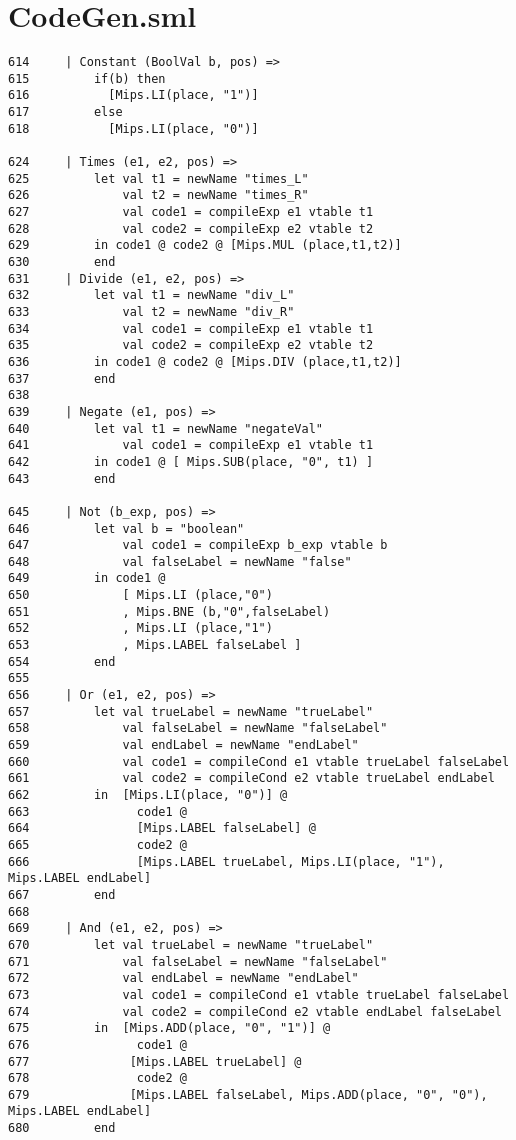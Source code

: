 \documentclass[paper=a4, fontsize=11pt]{scrartcl} %
\numberwithin{equation}{section} %
\numberwithin{figure}{section} %
\numberwithin{table}{section} %
\begin{document}
\chapter{CodeGen.sml}
\begin{lstlisting}
614	    | Constant (BoolVal b, pos) => 
615	        if(b) then 
616	          [Mips.LI(place, "1")] 
617	        else 
618	          [Mips.LI(place, "0")] 

624     | Times (e1, e2, pos) => 
625	        let val t1 = newName "times_L" 
626	            val t2 = newName "times_R" 
627	            val code1 = compileExp e1 vtable t1 
628	            val code2 = compileExp e2 vtable t2 
629	        in code1 @ code2 @ [Mips.MUL (place,t1,t2)] 
630	        end 
631	    | Divide (e1, e2, pos) => 
632	        let val t1 = newName "div_L" 
633	            val t2 = newName "div_R" 
634	            val code1 = compileExp e1 vtable t1 
635	            val code2 = compileExp e2 vtable t2 
636	        in code1 @ code2 @ [Mips.DIV (place,t1,t2)] 
637	        end 
638	 
639	    | Negate (e1, pos) => 
640	        let val t1 = newName "negateVal" 
641	            val code1 = compileExp e1 vtable t1 
642	        in code1 @ [ Mips.SUB(place, "0", t1) ] 
643	        end 

645	    | Not (b_exp, pos) => 
646	        let val b = "boolean" 
647	            val code1 = compileExp b_exp vtable b 
648	            val falseLabel = newName "false" 
649	        in code1 @ 
650	            [ Mips.LI (place,"0") 
651	            , Mips.BNE (b,"0",falseLabel) 
652	            , Mips.LI (place,"1") 
653	            , Mips.LABEL falseLabel ] 
654	        end 
655	     
656	    | Or (e1, e2, pos) => 
657	        let val trueLabel = newName "trueLabel" 
658	            val falseLabel = newName "falseLabel" 
659	            val endLabel = newName "endLabel" 
660	            val code1 = compileCond e1 vtable trueLabel falseLabel 
661	            val code2 = compileCond e2 vtable trueLabel endLabel 
662	        in  [Mips.LI(place, "0")] @  
663	              code1 @  
664	              [Mips.LABEL falseLabel] @  
665	              code2 @  
666	              [Mips.LABEL trueLabel, Mips.LI(place, "1"), Mips.LABEL endLabel] 
667	        end 
668
669	    | And (e1, e2, pos) => 
670	        let val trueLabel = newName "trueLabel" 
671	            val falseLabel = newName "falseLabel" 
672	            val endLabel = newName "endLabel" 
673	            val code1 = compileCond e1 vtable trueLabel falseLabel 
674	            val code2 = compileCond e2 vtable endLabel falseLabel 
675	        in  [Mips.ADD(place, "0", "1")] @  
676	              code1 @  
677	             [Mips.LABEL trueLabel] @  
678	              code2 @  
679	             [Mips.LABEL falseLabel, Mips.ADD(place, "0", "0"), Mips.LABEL endLabel] 
680	        end 	          


\end{lstlisting}
\end{document}

